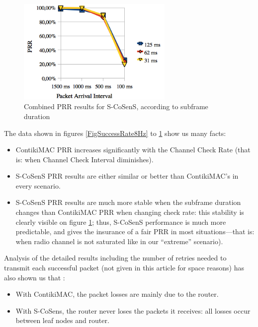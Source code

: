 \documentclass[conference]{IEEEtran}
\begin{document}
\begin{figure}
  \centering
  \includegraphics[width=7.5cm]{graphes/PRRstabilitySCoSenS.png}
  \caption{Combined PRR results for S-CoSenS,
           according to subframe duration}
  \label{FigSuccessRateSCoSenS}
\end{figure}

The data shown in figures \ref{FigSuccessRate8Hz} to
\ref{FigSuccessRateSCoSenS} show us many facts:

\begin{itemize}

\item ContikiMAC PRR increases significantly with the Channel Check Rate
      (that is: when Channel Check Interval diminishes).

\item S-CoSenS PRR results are either similar or better than ContikiMAC's
      in every scenario.

\item S-CoSenS PRR results are much more stable when the subframe duration
      changes than ContikiMAC PRR when changing check rate: this stability
      is clearly visible on figure \ref{FigSuccessRateSCoSenS}; thus,
      S-CoSenS performance is much more predictable, and gives
      the insurance of a fair PRR in most situations---that is:
      when radio channel is not saturated like in our ``extreme''
      scenario).

\end{itemize}

Analysis of the detailed results including the number of retries needed
to transmit each successful packet (not given in this article for space
reasons) has also shown us that :

\begin{itemize}

\item With ContikiMAC, the packet losses are mainly due to the router.

\item With S-CoSens, the router never loses the packets it receives:
      all losses occur between leaf nodes and router.

\end{itemize}
\end{document}
